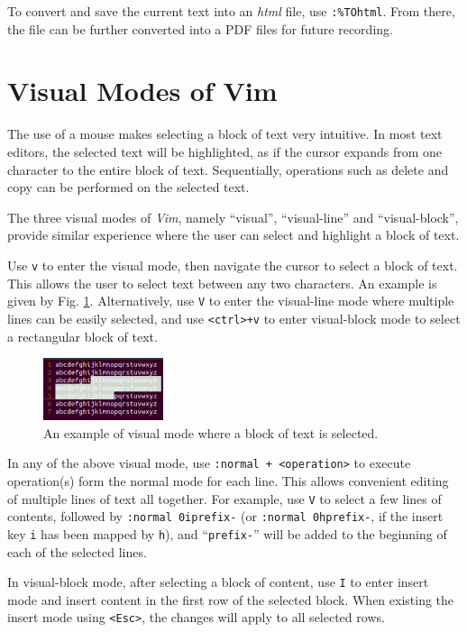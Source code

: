 To convert and save the current text into an \textit{html} file, use \verb|:%TOhtml|. From there, the file can be further converted into a PDF files for future recording.

\section{Visual Modes of Vim}

The use of a mouse makes selecting a block of text very intuitive. In most text editors, the selected text will be highlighted, as if the cursor expands from one character to the entire block of text. Sequentially, operations such as delete and copy can be performed on the selected text.

The three visual modes of \textit{Vim}, namely ``visual'', ``visual-line'' and ``visual-block'', provide similar experience where the user can select and highlight a block of text.

Use \verb|v| to enter the visual mode, then navigate the cursor to select a block of text. This allows the user to select text between any two characters. An example is given by Fig. \ref{ch:tfe:fig:vimvm1}. Alternatively, use \verb|V| to enter the visual-line mode where multiple lines can be easily selected, and use \verb|<ctrl>+v| to enter visual-block mode to select a rectangular block of text.

\begin{figure}
	\centering
	\includegraphics[width=100pt]{chapters/ch-text-file-editing/figures/vimvm1.png}
	\caption{An example of visual mode where a block of text is selected.} \label{ch:tfe:fig:vimvm1}
\end{figure}

In any of the above visual mode, use \verb|:normal + <operation>| to execute operation(s) form the normal mode for each line. This allows convenient editing of multiple lines of text all together. For example, use \verb|V| to select a few lines of contents, followed by \verb|:normal 0iprefix-| (or \verb|:normal 0hprefix-|, if the insert key \verb|i| has been mapped by \verb|h|), and ``\verb|prefix-|'' will be added to the beginning of each of the selected lines.

In visual-block mode, after selecting a block of content, use \verb|I| to enter insert mode and insert content in the first row of the selected block. When existing the insert mode using \verb|<Esc>|, the changes will apply to all selected rows.

